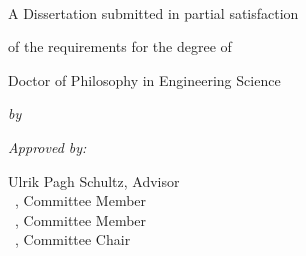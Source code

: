 \begin{titlepage}
	\centering
	{\large \publisher\par}
	~

	\vspace{36pt}
	{\Huge{}\selectfont\bfseries\booktitle\par}
	\vspace{24pt}

	{\large A Dissertation submitted in partial satisfaction\par\vspace*{.8ex}
	of the requirements for the degree of\par\vspace*{.8ex}
	Doctor of Philosophy in Engineering Science}

	\vspace{12pt}
	{\large\itshape by\par}
	\vspace{6pt}
	{\Large\itshape \authorname\par}
	\vspace{24pt}

	{\begin{flushleft}{\itshape Approved by:}
		\begin{multicols}{2}
			{Ulrik Pagh Schultz, Advisor\\\vspace*{.8ex}
			~, Committee Member\\\vspace*{.8ex}
			~, Committee Member\\\vspace*{.8ex}
			~, Committee Chair\\
			}\par
			\columnbreak
			{~\\
			~\\
			~}\par
		\end{multicols}
		\vspace{6pt}
		\begin{multicols}{2}
		~\\\columnbreak {\itshape %
		                }
		\end{multicols}	
	\end{flushleft}}

	{\large \editionyear{}}
\end{titlepage}

